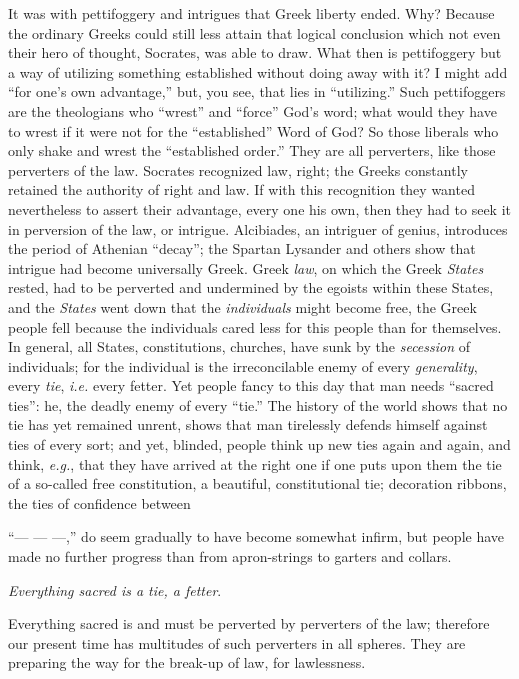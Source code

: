 It was with pettifoggery and intrigues that Greek liberty ended. Why? Because 
the ordinary Greeks could still less attain that logical conclusion which not 
even their hero of thought, Socrates, was able to draw. What then is 
pettifoggery but a way of utilizing something established without doing away 
with it? I might add ``for one's own advantage,'' but, you see, that lies in 
``utilizing.'' Such pettifoggers are the theologians who ``wrest'' and 
``force'' God's word; what would they have to wrest if it were not for the 
``established'' Word of God? So those liberals who only shake and wrest the 
``established order.'' They are all perverters, like those perverters of the 
law. Socrates recognized law, right; the Greeks constantly retained the 
authority of right and law. If with this recognition they wanted nevertheless 
to assert their advantage, every one his own, then they had to seek it in 
perversion of the law, or intrigue. Alcibiades, an intriguer of genius, 
introduces the period of Athenian ``decay''; the Spartan Lysander and others 
show that intrigue had become universally Greek. Greek \textit{law}, on which 
the Greek \textit{States} rested, had to be perverted and undermined by the 
egoists within these States, and the \textit{States} went down that the 
\textit{individuals} might become free, the Greek people fell because the 
individuals cared less for this people than for themselves. In general, all 
States, constitutions, churches, have sunk by the \textit{secession} of 
individuals; for the individual is the irreconcilable enemy of every 
\textit{generality}, every \textit{tie}, \textit{i.e.} every fetter. Yet 
people fancy to this day that man needs ``sacred ties'': he, the deadly 
enemy of every ``tie.'' The history of the world shows that no tie has yet 
remained unrent, shows that man tirelessly defends himself against ties of 
every sort; and yet, blinded, people think up new ties again and again, and 
think, \textit{e.g.}, that they have arrived at the right one if one puts upon 
them the tie of a so-called free constitution, a beautiful, constitutional 
tie; decoration ribbons, the ties of confidence between

``--- --- ---,'' do seem gradually to have become somewhat infirm, but people 
have made no further progress than from apron-strings to garters and collars.

\textit{Everything sacred is a tie, a fetter}.

Everything sacred is and must be perverted by perverters of the law; therefore 
our present time has multitudes of such perverters in all spheres. They are 
preparing the way for the break-up of law, for lawlessness.

